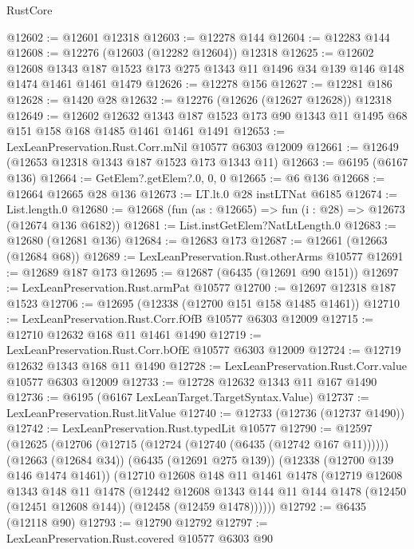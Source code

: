 \begin{lexlean}{RustCore}
\begin{coremodule}
@12602 := @12601 @12318
@12603 := @12278 @144
@12604 := @12283 @144
@12608 := @12276 (@12603 (@12282 @12604)) @12318
@12625 := @12602
    @12608
    @1343
    @187
    @1523
    @173
    @275
    @1343
    @11
    @1496
    @34
    @139
    @146
    @148
    @1474
    @1461
    @1461
    @1479
@12626 := @12278 @156
@12627 := @12281 @186
@12628 := @1420 @28
@12632 := @12276 (@12626 (@12627 @12628)) @12318
@12649 := @12602
    @12632
    @1343
    @187
    @1523
    @173
    @90
    @1343
    @11
    @1495
    @68
    @151
    @158
    @168
    @1485
    @1461
    @1461
    @1491
@12653 := LexLeanPreservation.Rust.Corr.mNil @10577 @6303 @12009
@12661 := @12649 (@12653 @12318 @1343 @187 @1523 @173 @1343 @11)
@12663 := @6195 (@6167 @136)
@12664 := GetElem?.getElem?.{0, 0, 0}
@12665 := @6 @136
@12668 := @12664 @12665 @28 @136
@12673 := LT.lt.{0} @28 instLTNat @6185
@12674 := List.length.{0}
@12680 := @12668 (fun (as : @12665) => fun (i : @28) => @12673 (@12674 @136 @6182))
@12681 := List.instGetElem?NatLtLength.{0}
@12683 := @12680 (@12681 @136)
@12684 := @12683 @173
@12687 := @12661 (@12663 (@12684 @68))
@12689 := LexLeanPreservation.Rust.otherArms @10577
@12691 := @12689 @187 @173
@12695 := @12687 (@6435 (@12691 @90 @151))
@12697 := LexLeanPreservation.Rust.armPat @10577
@12700 := @12697 @12318 @187 @1523
@12706 := @12695 (@12338 (@12700 @151 @158 @1485 @1461))
@12710 := LexLeanPreservation.Rust.Corr.fOfB @10577 @6303 @12009
@12715 := @12710 @12632 @168 @11 @1461 @1490
@12719 := LexLeanPreservation.Rust.Corr.bOfE @10577 @6303 @12009
@12724 := @12719 @12632 @1343 @168 @11 @1490
@12728 := LexLeanPreservation.Rust.Corr.value @10577 @6303 @12009
@12733 := @12728 @12632 @1343 @11 @167 @1490
@12736 := @6195 (@6167 LexLeanTarget.TargetSyntax.Value)
@12737 := LexLeanPreservation.Rust.litValue
@12740 := @12733 (@12736 (@12737 @1490))
@12742 := LexLeanPreservation.Rust.typedLit @10577
@12790 := @12597
    (@12625
      (@12706 (@12715 (@12724 (@12740 (@6435 (@12742 @167 @11))))))
      (@12663 (@12684 @34))
      (@6435 (@12691 @275 @139))
      (@12338 (@12700 @139 @146 @1474 @1461))
      (@12710
        @12608
        @148
        @11
        @1461
        @1478
        (@12719
          @12608
          @1343
          @148
          @11
          @1478
          (@12442
            @12608
            @1343
            @144
            @11
            @144
            @1478
            (@12450 (@12451 @12608 @144))
            (@12458 (@12459 @1478))))))
@12792 := @6435 (@12118 @90)
@12793 := @12790 @12792
@12797 := LexLeanPreservation.Rust.covered @10577 @6303 @90

\end{coremodule}
\end{lexlean}

